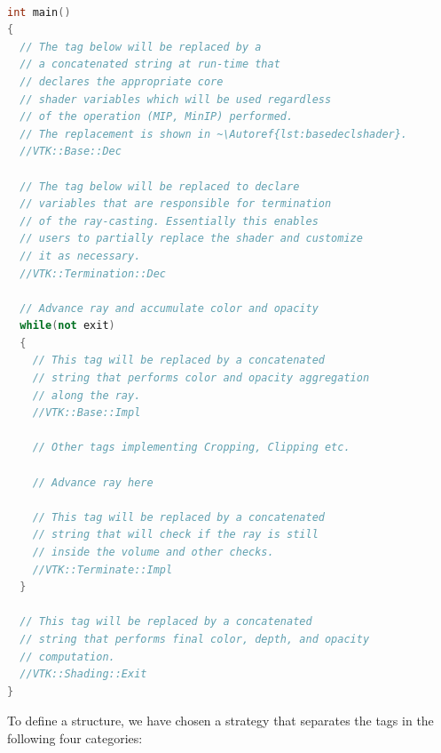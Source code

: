 \begin{lstlisting}[language=C++, caption={Fragment shader tags},
                   captionpos=b, frame=single, breaklines=true,
                   label=lst:skeletonshader]

int main()
{
  // The tag below will be replaced by a
  // a concatenated string at run-time that
  // declares the appropriate core
  // shader variables which will be used regardless
  // of the operation (MIP, MinIP) performed.
  // The replacement is shown in ~\Autoref{lst:basedeclshader}.
  //VTK::Base::Dec

  // The tag below will be replaced to declare
  // variables that are responsible for termination
  // of the ray-casting. Essentially this enables
  // users to partially replace the shader and customize
  // it as necessary.
  //VTK::Termination::Dec

  // Advance ray and accumulate color and opacity
  while(not exit)
  {
    // This tag will be replaced by a concatenated
    // string that performs color and opacity aggregation
    // along the ray.
    //VTK::Base::Impl

    // Other tags implementing Cropping, Clipping etc.

    // Advance ray here

    // This tag will be replaced by a concatenated
    // string that will check if the ray is still
    // inside the volume and other checks.
    //VTK::Terminate::Impl
  }

  // This tag will be replaced by a concatenated
  // string that performs final color, depth, and opacity
  // computation.
  //VTK::Shading::Exit
}

\end{lstlisting}

To define a structure, we have chosen a strategy that separates the tags in
the following four categories:

